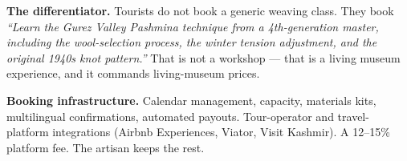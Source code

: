 \documentclass[11pt, a4paper]{article}
\begin{document}
\begin{layerbox}
\textbf{The differentiator.} Tourists do not book a generic weaving class. They book {\itshape ``Learn the Gurez Valley Pashmina technique from a 4th-generation master, including the wool-selection process, the winter tension adjustment, and the original 1940s knot pattern.''} That is not a workshop --- that is a living museum experience, and it commands living-museum prices.

\textbf{Booking infrastructure.} Calendar management, capacity, materials kits, multilingual confirmations, automated payouts. Tour-operator and travel-platform integrations (Airbnb Experiences, Viator, Visit Kashmir). A 12--15\% platform fee. The artisan keeps the rest.
\end{layerbox}

\end{document}
